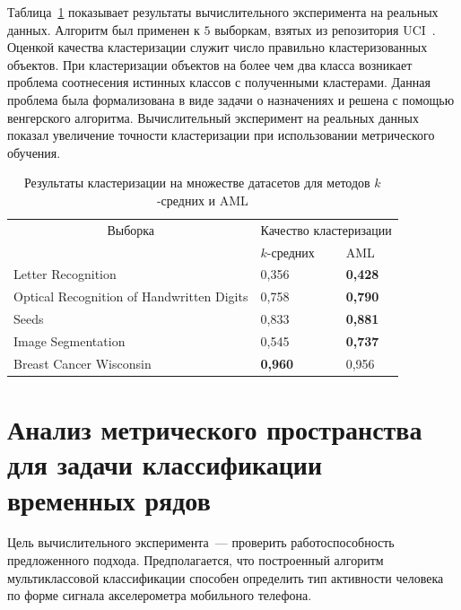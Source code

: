 Таблица~\ref{ch4:tbl:clusteing_results} показывает результаты вычислительного эксперимента на реальных
данных.
Алгоритм был применен к $5$ выборкам, взятых из репозитория UCI~\cite{uci2017}.
Оценкой качества кластеризации служит число правильно кластеризованных объектов.
При клас\-те\-ри\-за\-ции объектов на более чем два класса возникает проблема соотнесения истинных классов с полученными кластерами.
Данная проблема была формализована в виде задачи о назначениях и решена с помощью венгерского алгоритма. Вычислительный эксперимент на реальных данных показал увеличение точности кластеризации при использовании метрического обучения.
\begin{table} %
\centering
\caption{Результаты кластеризации на множестве датасетов для методов $k$-средних и AML}
\label{ch4:tbl:clusteing_results}

\vspace{2ex}

\begin{tabular}{|l|l|l|}
\hline
\multicolumn{1}{|c}{Выборка}                  & \multicolumn{2}{c|}{Качество кластеризации} \\ \cline{2-3}
                                          & $k$-средних               & AML                 \\
\hline
Letter Recognition                        & 0,356                 & \textbf{0,428}             \\
Optical Recognition of Handwritten Digits & 0,758                 & \textbf{0,790}               \\
Seeds                                     & 0,833                 & \textbf{0,881}            \\
Image Segmentation                        & 0,545                 & \textbf{0,737}            \\
Breast Cancer Wisconsin                   & \textbf{0,960}                 & 0,956               \\ \hline
\end{tabular}
\end{table}

\section{Анализ метрического пространства для задачи классификации временных рядов}
\label{sec:ch5:exp_classification}
	Цель вычислительного эксперимента~--- проверить работоспособность предложенного подхода.
	Предполагается, что построенный алгоритм мультиклассовой классификации способен определить тип активности человека по форме сигнала акселерометра мобильного телефона.
	
